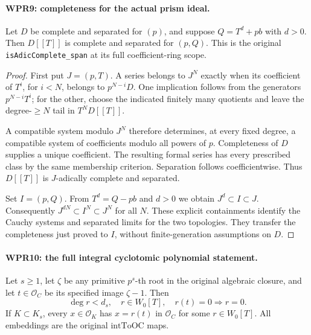 \documentclass[11pt,a4paper]{article}
\numberwithin{equation}{section}
\theoremstyle{remark}\newtheorem{remark}[theorem]{Remark}
\begin{document}
\paragraph{WPR9: completeness for the actual prism ideal.}
\label{claim:WPR9}
Let $D$ be complete and separated for $(p)$, and suppose
$Q=T^d+pb$ with $d>0$. Then $D[[T]]$ is complete and
separated for $(p,Q)$. This is the original
\texttt{is\allowbreak Adic\allowbreak Complete\_\allowbreak span} at its full coefficient-ring scope.

\begin{proof}
First put $J=(p,T)$. A series belongs to $J^N$ exactly when
its coefficient of $T^i$, for $i<N$, belongs to $p^{N-i}D$.
One implication follows from the generators $p^{N-i}T^i$;
for the other, choose the indicated finitely many quotients and
leave the degree-$\geq N$ tail in $T^ND[[T]]$.

A compatible system modulo $J^N$ therefore determines, at every
fixed degree, a compatible system of coefficients modulo all
powers of $p$. Completeness of $D$ supplies a unique coefficient.
The resulting formal series has every prescribed class by the
same membership criterion. Separation follows coefficientwise.
Thus $D[[T]]$ is $J$-adically complete and separated.

Set $I=(p,Q)$. From $T^d=Q-pb$ and $d>0$ we obtain
$J^d\subset I\subset J$. Consequently
$J^{dN}\subset I^N\subset J^N$ for all $N$. These explicit
containments identify the Cauchy systems and separated limits
for the two topologies. They transfer the completeness just
proved to $I$, without finite-generation assumptions on $D$.
\end{proof}

\paragraph{WPR10: the full integral cyclotomic polynomial statement.}
\label{claim:WPR10}
Let $s\geq1$, let $\zeta$ be any primitive $p^s$-th root in
the original algebraic closure, and let
$t\in\mathcal O_C$ be its specified image $\zeta-1$.
Then
\[
 \deg r<d_s,\quad r\in W_0[T],\quad r(t)=0
                       \Longrightarrow r=0.                  \tag{WPR.13}
\]
If $K\subset K_s$, every $x\in\mathcal O_K$ has
$x=r(t)$ in $\mathcal O_C$ for some $r\in W_0[T]$.
All embeddings are the original $\mathrm{intToOC}$ maps.
\end{document}
